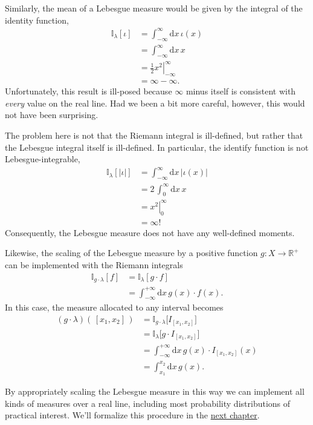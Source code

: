 \documentclass[
  letterpaper,
  DIV=11,
  numbers=noendperiod]{scrartcl}
\begin{document}
Similarly, the mean of a Lebesgue measure would be given by the integral
of the identity function, \begin{align*}
\mathbb{I}_{\lambda}[\iota]
&=
\int_{-\infty}^{\infty} \mathrm{d} x \, \iota(x)
\\
&=
\int_{-\infty}^{\infty} \mathrm{d} x \, x
\\
&=
\left. \frac{1}{2} x^{2} \right|^{\infty}_{-\infty}
\\
&=
\infty - \infty.
\end{align*} Unfortunately, this result is ill-posed because \(\infty\)
minus itself is consistent with \emph{every} value on the real line. Had
we been a bit more careful, however, this would not have been
surprising.

The problem here is not that the Riemann integral is ill-defined, but
rather that the Lebesgue integral itself is ill-defined. In particular,
the identify function is not Lebesgue-integrable, \begin{align*}
\mathbb{I}_{\lambda}[| \iota |]
&=
\int_{-\infty}^{\infty} \mathrm{d} x \, | \iota(x) |
\\
&=
2 \, \int_{0}^{\infty} \mathrm{d} x \, x
\\
&=
\left. x^{2} \right|^{\infty}_{0}
\\
&=
\infty!
\end{align*} Consequently, the Lebesgue measure does not have any
well-defined moments.

Likewise, the scaling of the Lebesgue measure by a positive function
\(g : X \rightarrow \mathbb{R}^{+}\) can be implemented with the Riemann
integrals \begin{align*}
\mathbb{I}_{g \cdot \lambda}[f]
&=
\mathbb{I}_{\lambda}[g \cdot f]
\\
&=
\int_{-\infty}^{+\infty} \mathrm{d} x \, g(x) \cdot f(x).
\end{align*} In this case, the measure allocated to any interval becomes
\begin{align*}
(g \cdot \lambda) ( \, [x_{1}, x_{2} ] \, )
&=
\mathbb{I}_{g \cdot \lambda} \big[ I_{ [x_{1}, x_{2}] } \big]
\\
&=
\mathbb{I}_{\lambda} \big[ g \cdot I_{ [x_{1}, x_{2}] } \big]
\\
&=
\int_{-\infty}^{+\infty}
\mathrm{d} x \, g(x) \cdot I_{ [x_{1}, x_{2}] }(x)
\\
&=
\int_{x_{1}}^{x_{2}} \mathrm{d} x \, g(x).
\end{align*}

By appropriately scaling the Lebesgue measure in this way we can
implement all kinds of measures over a real line, including most
probability distributions of practical interest. We'll formalize this
procedure in the
\href{http://www.symplectomorphic.com/assets/chapters_html/density_functions.html}{next
chapter}.
\end{document}
